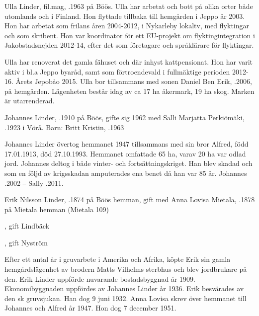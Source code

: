
Ulla Linder, fil.mag,  .1963 på Böös. Ulla har arbetat och bott på olika orter både utomlands och i Finland. Hon flyttade tillbaka till hemgården i Jeppo år 2003. Hon har arbetat som frilans åren 2004-2012, i Nykarleby lokaltv, med flyktingar och som skribent. Hon var koordinator för ett EU-projekt om flyktingintegration i Jakobstadsnejden 2012-14, efter det som företagare och språklärare för flyktingar.


Ulla har renoverat det gamla fähuset och där inhyst kattpensionat. Hon har varit aktiv i bl.a Jeppo byaråd, samt som förtroendevald i fullmäktige perioden 2012-16. Årets Jepobåo 2015. Ulla bor tillsammans med sonen Daniel Ben Erik, .2006, på hemgården. Lägenheten består idag av ca 17 ha åkermark, 19 ha skog. Marken är utarrenderad.


Johannes Linder, .1910 på Böös, gifte sig 1962 med Salli Marjatta Perkiömäki, .1923 i Vörå.
Barn: Britt  Kristin, .1963

Johannes Linder övertog hemmanet 1947 tillsammans med sin bror Alfred, född 17.01.1913, död 27.10.1993. Hemmanet omfattade 65 ha, varav 20 ha var odlad jord. Johannes deltog i både vinter- och fortsättningskriget. Han blev skadad och som en följd av krigsskadan amputerades ena benet då han var 85 år.
Johannes .2002  --  Sally .2011.


Erik Nilsson Linder, .1874 på Böös hemman, gift med Anna Lovisa Mietala, .1878 på Mietala hemman (Mietala 109)
\begin{jhchildren}
  \item {}
  \item {}, gift Lindbäck
  \item {}
  \item {}, gift Nyström
  \item {}
  \item {}
  \item {}
  \item {}
  \item {}
\end{jhchildren}
Efter ett antal år i gruvarbete i Amerika och Afrika, köpte  Erik sin gamla hemgårdslägenhet av brodern Matts Vilhelms sterbhus och blev jordbrukare på den. Erik Linder uppförde nuvarande bostadsbyggnad år 1909. Ekonomibyggnaden uppfördes av Johannes Linder år 1936. Erik besvärades  av den sk gruvsjukan. Han  dog 9 juni 1932. Anna Lovisa skrev över hemmanet till Johannes och Alfred år 1947. Hon dog 7 december 1951.


